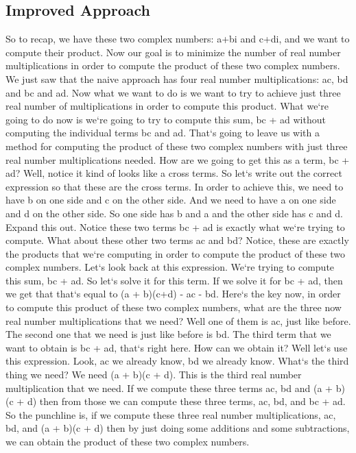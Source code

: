 \subsection{Improved Approach}
So to recap, we have these two complex numbers: a+bi and c+di, and we want to compute their product.
Now our goal is to minimize the number of real number multiplications in order to compute the product of these two complex numbers.
We just saw that the naive approach has four real number multiplications: ac, bd and bc and ad.
Now what we want to do is we want to try to achieve just three real number of multiplications in order to compute this product.
What we`re going to do now is we`re going to try to compute this sum, bc + ad without computing the individual terms bc and ad.
That`s going to leave us with a method for computing the product of these two complex numbers with just three real number multiplications needed.
How are we going to get this as a term, bc + ad? Well, notice it kind of looks like a cross terms.
So let`s write out the correct expression so that these are the cross terms.
In order to achieve this, we need to have b on one side and c on the other side.
And we need to have a on one side and d on the other side.
So one side has b and a and the other side has c and d.
Expand this out.
Notice these two terms bc + ad is exactly what we`re trying to compute.
What about these other two terms ac and bd? Notice, these are exactly the products that we`re computing in order to compute the product of these two complex numbers.
Let`s look back at this expression.
We`re trying to compute this sum, bc + ad.
So let`s solve it for this term.
If we solve it for bc + ad, then we get that that`s equal to (a + b)(c+d) - ac - bd.
Here`s the key now, in order to compute this product of these two complex numbers, what are the three now real number multiplications that we need? Well one of them is ac, just like before.
The second one that we need is just like before is bd.
The third term that we want to obtain is bc + ad, that`s right here.
How can we obtain it? Well let`s use this expression.
Look, ac we already know, bd we already know.
What`s the third thing we need? We need (a + b)(c + d).
This is the third real number multiplication that we need.
If we compute these three terms ac, bd and (a + b)(c + d) then from those we can compute these three terms, ac, bd, and bc + ad.
So the punchline is, if we compute these three real number multiplications, ac, bd, and (a + b)(c + d) then by just doing some additions and some subtractions, we can obtain the product of these two complex numbers.
